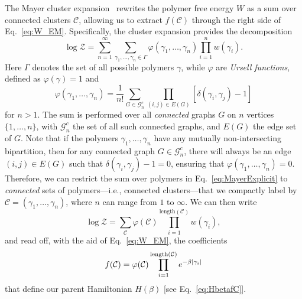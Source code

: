 \documentclass[aps,prl,twocolumn,floatfix,nofootinbib]{revtex4-2}
\theoremstyle{definition}
\renewcommand{\comm}[1]{\left[ #1 \right]}
\newcommand{\CC}{\mathcal{C}}
\begin{document}
The Mayer cluster expansion~\cite{Friedli_Velenik_2017} rewrites the polymer free energy $W$ as a sum over connected clusters $\mathcal{C}$, allowing us to extract $f(\mathcal{C})$ through the right side of Eq.~\eqref{eq:W_EM}. Specifically,
%
the cluster expansion provides the decomposition
\begin{equation}
    \log \mathcal{Z} = \sum_{n = 1}^\infty \sum_{\gamma_1, \dots, \gamma_n \in \Gamma} \varphi(\gamma_1, \dots,\gamma_n) \prod_{i = 1}^n w(\gamma_i).
    \label{eq:MayerExplicit}
\end{equation}
Here $\Gamma$ denotes the set of all possible polymers $\gamma$, while $\varphi$ are \emph{Ursell functions}, defined as $\varphi(\gamma) = 1$ and 
\begin{equation}
    \varphi(\gamma_1,  \dots, \gamma_n) = \frac{1}{n!} \sum_{G \in \mathcal{G}_n^c} \prod_{(i,j) \in {E(G)}} \comm{\delta(\gamma_i,\gamma_j) - 1}
\end{equation}
for $n>1$. The sum is performed over all \emph{connected} graphs $G$ on $n$ vertices $\{1, \ldots , n \}$, with $\mathcal{G}^c_n$ the set of all such connected graphs, and $E(G)$ the edge set of $G$. Note that if the polymers $\gamma_1, \dots, \gamma_n$ have any mutually non-intersecting bipartition, then for any connected graph $G \in \mathcal{G}^c_n$, there will always be an edge $(i,j) \in E(G)$ such that $\delta(\gamma_i,\gamma_j) - 1 = 0$, ensuring that $\varphi(\gamma_1, \dots, \gamma_n) = 0$. Therefore, we can restrict the sum over polymers in Eq.~\eqref{eq:MayerExplicit} to \emph{connected} sets of polymers---i.e., connected clusters---that we compactly label by $\mathcal{C} = (\gamma_1,\ldots,\gamma_n)$, where $n$ can range from $1$ to $\infty$.
We can then write
\begin{equation}
    \log \mathcal{Z} = \sum_{\CC} \varphi(\CC) \prod_{i = 1}^{\text{length}(\CC)} w(\gamma_i),
\end{equation}
and read off, with the aid of Eq.~\eqref{eq:W_EM}, the coefficients
\begin{equation}
\label{eq:fc_endmatter}
  f(\CC) = \varphi(\CC) \prod_{i = 1}^{\text{length}(\CC)} e^{-\beta\abs{\gamma_i}}
\end{equation}
that define our parent Hamiltonian $H(\beta)$ [see Eq.~\eqref{eq:HbetafC}].
\end{document}
